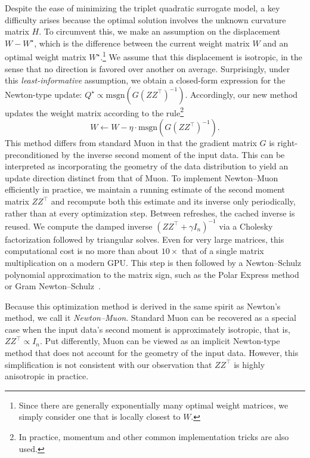 \documentclass[11pt]{article}
\begin{document}
Despite the ease of minimizing the triplet quadratic surrogate model, a key difficulty arises because the optimal solution involves the unknown curvature matrix $H$. To circumvent this, we make an assumption on the displacement $W - W^\star$, which is the difference between the current weight matrix $W$ and an optimal weight matrix $W^\star$.\footnote{Since there are generally exponentially many optimal weight matrices, we simply consider one that is locally closest to $W$.} We assume that this displacement is isotropic, in the sense that no direction is favored over another on average. Surprisingly, under this \textit{least-informative} assumption, we obtain a closed-form expression for the Newton-type update: $Q^\star \propto \mathrm{msgn}(G(ZZ^\top)^{-1})$. Accordingly, our new method updates the weight matrix according to the rule\footnote{In practice, momentum and other common implementation tricks are also used.}
\[
W \leftarrow W - \eta \cdot \mathrm{msgn}(G(ZZ^\top)^{-1}).
\]
This method differs from standard Muon in that the gradient matrix $G$ is right-preconditioned by the inverse second moment of the input data. This can be interpreted as incorporating the geometry of the data distribution to yield an update direction distinct from that of Muon. To implement Newton--Muon efficiently in practice, we maintain a running estimate of the second moment matrix $ZZ^\top$ and recompute both this estimate and its inverse only periodically, rather than at every optimization step. Between refreshes, the cached inverse is reused. We compute the damped inverse $(ZZ^\top+\gamma I_n)^{-1}$ via a Cholesky factorization followed by triangular solves. Even for very large matrices, this computational cost is no more than about $10\times$ that of a single matrix multiplication on a modern GPU. This step is then followed by a Newton--Schulz polynomial approximation to the matrix sign, such as the Polar Express method~\citep{amsel2025polar} or Gram Newton--Schulz~\citep{GramNewtonSchulz}.
 
Because this optimization method is derived in the same spirit as Newton's method, we call it \textit{Newton--Muon}. Standard Muon can be recovered as a special case when the input data's second moment is approximately isotropic, that is, $ZZ^\top \propto I_n$. Put differently, Muon can be viewed as an implicit Newton-type method that does not account for the geometry of the input data. However, this simplification is not consistent with our observation that $ZZ^\top$ is highly anisotropic in practice.
 
\end{document}
